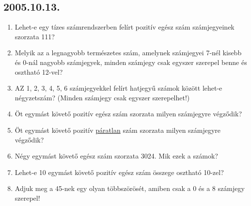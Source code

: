 \documentclass{article}
\begin{document}
\subsection*{2005.10.13.}
\begin{enumerate}
\item Lehet-e egy tízes számrendszerben felírt pozitív egész szám számjegyeinek szorzata 111?

\item Melyik az a legnagyobb természetes szám, amelynek számjegyei 7-nél kisebb és 0-nál nagyobb számjegyek, minden számjegy csak egyszer szerepel benne és osztható 12-vel?

\item AZ 1, 2, 3, 4, 5, 6 számjegyekkel felírt hatjegyű számok között lehet-e négyzetszám? (Minden számjegy csak egyszer szerepelhet!)

\item Öt egymást követő pozitív egész szám szorzata milyen számjegyre végződik?

\item Öt egymást követő pozitív \underline {páratlan} szám szorzata milyen számjegyre végződik?

\item Négy egymást követő egész szám szorzata 3024. Mik ezek a számok?

\item Lehet-e 10 egymást követő pozitív egész szám összege osztható 10-zel?

\item Adjuk meg a 45-nek egy olyan többszörösét, amiben csak a 0 és a 8 számjegy szerepel!
\end{enumerate}
\end{document}
